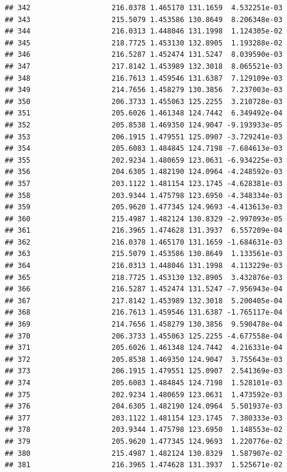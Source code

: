 \documentclass[
]{article}
\begin{document}
\begin{verbatim}
## 342                   216.0378 1.465170 131.1659  4.532251e-03
## 343                   215.5079 1.453586 130.8649  8.206348e-03
## 344                   216.0313 1.448046 131.1998  1.124305e-02
## 345                   218.7725 1.453130 132.8905  1.193288e-02
## 346                   216.5287 1.452474 131.5247  8.039590e-03
## 347                   217.8142 1.453989 132.3018  8.065521e-03
## 348                   216.7613 1.459546 131.6387  7.129109e-03
## 349                   214.7656 1.458279 130.3856  7.237003e-03
## 350                   206.3733 1.455063 125.2255  3.210728e-03
## 351                   205.6026 1.461348 124.7442  6.349492e-04
## 352                   205.8538 1.469350 124.9047 -9.193933e-05
## 353                   206.1915 1.479551 125.0907 -3.729241e-03
## 354                   205.6083 1.484845 124.7198 -7.684613e-03
## 355                   202.9234 1.480659 123.0631 -6.934225e-03
## 356                   204.6305 1.482190 124.0964 -4.248592e-03
## 357                   203.1122 1.481154 123.1745 -4.628381e-03
## 358                   203.9344 1.475798 123.6950 -4.348334e-03
## 359                   205.9620 1.477345 124.9693 -4.413613e-03
## 360                   215.4987 1.482124 130.8329 -2.997093e-05
## 361                   216.3965 1.474628 131.3937  6.557209e-04
## 362                   216.0378 1.465170 131.1659 -1.684631e-03
## 363                   215.5079 1.453586 130.8649  1.133561e-03
## 364                   216.0313 1.448046 131.1998  4.113229e-03
## 365                   218.7725 1.453130 132.8905  3.432876e-03
## 366                   216.5287 1.452474 131.5247 -7.956943e-04
## 367                   217.8142 1.453989 132.3018  5.200405e-04
## 368                   216.7613 1.459546 131.6387 -1.765117e-04
## 369                   214.7656 1.458279 130.3856  9.590478e-04
## 370                   206.3733 1.455063 125.2255 -4.677558e-04
## 371                   205.6026 1.461348 124.7442  4.216331e-04
## 372                   205.8538 1.469350 124.9047  3.755643e-03
## 373                   206.1915 1.479551 125.0907  2.541369e-03
## 374                   205.6083 1.484845 124.7198  1.528101e-03
## 375                   202.9234 1.480659 123.0631  1.473592e-03
## 376                   204.6305 1.482190 124.0964  5.501937e-03
## 377                   203.1122 1.481154 123.1745  7.380333e-03
## 378                   203.9344 1.475798 123.6950  1.148553e-02
## 379                   205.9620 1.477345 124.9693  1.220776e-02
## 380                   215.4987 1.482124 130.8329  1.587907e-02
## 381                   216.3965 1.474628 131.3937  1.525671e-02

\end{verbatim}
\end{document}
